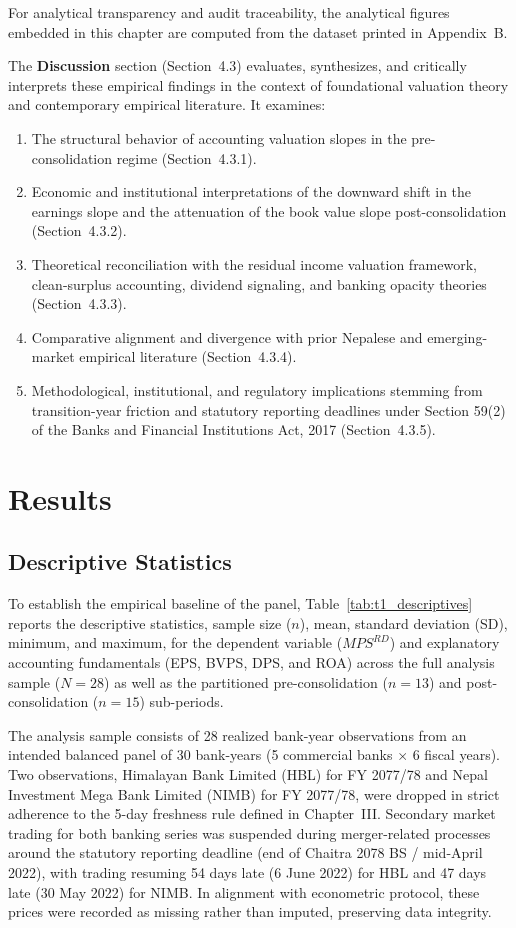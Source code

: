 For analytical transparency and audit traceability, the analytical figures embedded in this chapter are computed from the dataset printed in Appendix~B.

The \textbf{Discussion} section (Section~4.3) evaluates, synthesizes, and critically interprets these empirical findings in the context of foundational valuation theory and contemporary empirical literature. It examines:
\begin{enumerate}
    \item The structural behavior of accounting valuation slopes in the pre-consolidation regime (Section~4.3.1).
    \item Economic and institutional interpretations of the downward shift in the earnings slope and the attenuation of the book value slope post-consolidation (Section~4.3.2).
    \item Theoretical reconciliation with the \citet{ohlson1995} residual income valuation framework, clean-surplus accounting, dividend signaling, and banking opacity theories (Section~4.3.3).
    \item Comparative alignment and divergence with prior Nepalese and emerging-market empirical literature (Section~4.3.4).
    \item Methodological, institutional, and regulatory implications stemming from transition-year friction and statutory reporting deadlines under Section 59(2) of the Banks and Financial Institutions Act, 2017 (Section~4.3.5).
\end{enumerate}

\section{Results}

\subsection{Descriptive Statistics}
To establish the empirical baseline of the panel, Table~\ref{tab:t1_descriptives} reports the descriptive statistics, sample size ($n$), mean, standard deviation (SD), minimum, and maximum, for the dependent variable ($\mathit{MPS}^{RD}$) and explanatory accounting fundamentals (EPS, BVPS, DPS, and ROA) across the full analysis sample ($N = 28$) as well as the partitioned pre-consolidation ($n = 13$) and post-consolidation ($n = 15$) sub-periods.

The analysis sample consists of 28 realized bank-year observations from an intended balanced panel of 30 bank-years (5 commercial banks $\times$ 6 fiscal years). Two observations, Himalayan Bank Limited (HBL) for FY 2077/78 and Nepal Investment Mega Bank Limited (NIMB) for FY 2077/78, were dropped in strict adherence to the 5-day freshness rule defined in Chapter~III. Secondary market trading for both banking series was suspended during merger-related processes around the statutory reporting deadline (end of Chaitra 2078 BS / mid-April 2022), with trading resuming 54 days late (6 June 2022) for HBL and 47 days late (30 May 2022) for NIMB. In alignment with econometric protocol, these prices were recorded as missing rather than imputed, preserving data integrity.

